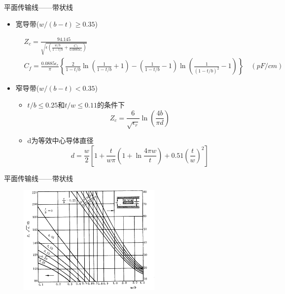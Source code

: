 \begin{frame}{平面传输线——带状线}
    \begin{itemize}
        \item 宽导带($w/(b-t)\geqslant 0.35$)
        \begin{tiny}
            \begin{align*}
                    &Z_c=\frac{94.145}{\sqrt{\epsilon\left(\frac{w/b}{1-t/b}+\frac{C_f}{0.0885\epsilon_r}\right)}} \\
                    &C_f=\frac{0.0885\epsilon_r}{\pi}\left\{\frac{2}{1-t/b}\ln\left(\frac{1}{1-t/b}+1\right)
                      -\left(\frac{1}{1-t/b}-1\right)\ln\left(\frac{1}{(1-t/b)^2}-1\right)\right\}\quad (pF/cm)
            \end{align*}
        \end{tiny}
        \item 窄导带($w/(b-t)<0.35$)
              \begin{itemize}
                  \item $t/b\leqslant 0.25$和$t/w\leqslant 0.11$的条件下\\
                        $$Z_c=\frac{6}{\sqrt{\epsilon_r}}\ln\left(\frac{4b}{\pi d}\right)$$
                  \item d为等效中心导体直径\\
                        $$d=\frac{w}{2}\left[1+\frac{t}{w\pi}\left(1+\ln\frac{4\pi w}{t}\right)+0.51\left(\frac{t}{w}\right)^2\right]$$
              \end{itemize}
    \end{itemize}
\end{frame}

\begin{frame}{平面传输线——带状线}
    \begin{figure}
        \includegraphics[width=7cm]{Cha6//fig6-37.png}
    \end{figure}
\end{frame}


